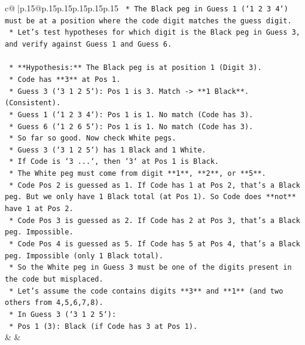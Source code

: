 \documentclass{article}
\begin{document}
{\begin{supertabular}{c@{$\;$}|p{.15\linewidth}@{}p{.15\linewidth}p{.15\linewidth}p{.15\linewidth}p{.15\linewidth}p{.15\linewidth}}
{{{\texttt{    *   The Black peg in Guess 1 (`1 2 3 4`) must be at a position where the code digit matches the guess digit.} \\
\texttt{    *   Let's test hypotheses for which digit is the Black peg in Guess 3, and verify against Guess 1 and Guess 6.} \\
\\ 
\texttt{    *   **Hypothesis:** The Black peg is at position 1 (Digit 3).} \\
\texttt{        *   Code has **3** at Pos 1.} \\
\texttt{        *   Guess 3 (`3 1 2 5`): Pos 1 is 3. Match {-}> **1 Black**. (Consistent).} \\
\texttt{        *   Guess 1 (`1 2 3 4`): Pos 1 is 1. No match (Code has 3).} \\
\texttt{        *   Guess 6 (`1 2 6 5`): Pos 1 is 1. No match (Code has 3).} \\
\texttt{        *   So far so good. Now check White pegs.} \\
\texttt{        *   Guess 3 (`3 1 2 5`) has 1 Black and 1 White.} \\
\texttt{            *   If Code is `3 ...`, then `3` at Pos 1 is Black.} \\
\texttt{            *   The White peg must come from digit **1**, **2**, or **5**.} \\
\texttt{            *   Code Pos 2 is guessed as 1. If Code has 1 at Pos 2, that's a Black peg. But we only have 1 Black total (at Pos 1). So Code does **not** have 1 at Pos 2.} \\
\texttt{            *   Code Pos 3 is guessed as 2. If Code has 2 at Pos 3, that's a Black peg. Impossible.} \\
\texttt{            *   Code Pos 4 is guessed as 5. If Code has 5 at Pos 4, that's a Black peg. Impossible (only 1 Black total).} \\
\texttt{            *   So the White peg in Guess 3 must be one of the digits present in the code but misplaced.} \\
\texttt{            *   Let's assume the code contains digits **3** and **1** (and two others from 4,5,6,7,8).} \\
\texttt{            *   In Guess 3 (`3 1 2 5`):} \\
\texttt{                *   Pos 1 (3): Black (if Code has 3 at Pos 1).} \\
            }
        }
    }
    & & \\ \\


\end{supertabular}}
\end{document}
